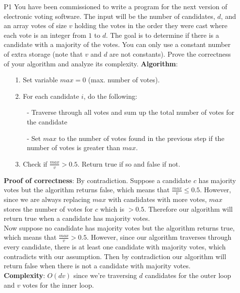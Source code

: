\documentclass{article}
\begin{document}
\begin{itemize}
\begin{itemize}
          \end{itemize}
    \item [P1] You have been commissioned to write a program for the next version of electronic voting software. The input will be the number of candidates, $d$, and an array votes of size $v$ holding the votes in the order they were cast where each vote is an integer from $1$ to $d$. The goal is to determine if there is a candidate with a majority of the votes. You can only use a constant number of extra storage (note that $v$ and $d$ are not constants). Prove the correctness of your algorithm and analyze its complexity.
          \textbf{Algorithm}:
          \begin{itemize}
              \item [1.] Set variable $max=0$ (max. number of votes).
              \item [2.] For each candidate $i$, do the following:
                    \begin{itemize}
                        \item [-] Traverse through all votes and sum up the total number of votes for the candidate
                        \item [-] Set $max$ to the number of votes found in the previous step if the number of votes is greater than $max$.
                    \end{itemize}
              \item [3.] Check if $\frac{max}{v}>0.5$. Return true if so and false if not.
          \end{itemize}
          \textbf{Proof of correctness}: By contradiction. Suppose a candidate $c$ has majority votes but the algorithm returns false, which means that $\frac{max}{v}\leq 0.5$. However, since we are always replacing $max$ with candidates with more votes, $max$ stores the number of votes for $c$ which is $>0.5$. Therefore our algorithm will return true when a candidate has majority votes.\\
          Now suppose no candidate has majority votes but the algorithm returns true, which means that $\frac{max}{v}>0.5$. However, since our algorithm traverses through every candidate, there is at least one candidate with majority votes, which contradicts with our assumption. Then by contradiction our algorithm will return false when there is not a candidate with majority votes.\\
          \textbf{Complexity}: $O(dv)$ since we're traversing $d$ candidates for the outer loop and $v$ votes for the inner loop.

\end{itemize}
\end{document}

